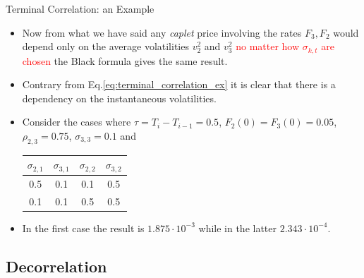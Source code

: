 \documentclass{beamer}
\begin{document}
\begin{frame}{Terminal Correlation: an Example}
\begin{itemize}
\item Now from what we have said any \emph{caplet} price involving the rates $F_3, F_2$ would depend only on the average volatilities $v_2^2$ and $v_3^2$ \textcolor{red}{no matter how $\sigma_{k,t}$ are chosen} the Black formula gives the same result.
\item Contrary from Eq.\ref{eq:terminal_correlation_ex} it is clear that there is a dependency on the instantaneous volatilities.
\item Consider the cases where $\tau=T_i - T_{i-1}=0.5$, $F_2(0)=F_3(0)=0.05$, $\rho_{2,3}=0.75$, $\sigma_{3,3}=0.1$ and
\begin{center}
\begin{tabular}{|c|c|c|c|}
\hline
$\sigma_{2,1}$ & $\sigma_{3,1}$ & $\sigma_{2,2}$ & $\sigma_{3,2}$ \\ \hline
0.5 & 0.1 & 0.1 & 0.5 \\ \hline
0.1 & 0.1 & 0.5 & 0.5 \\ \hline
\end{tabular}
\end{center}
\item In the first case the result is $1.875\cdot10^{-3}$ while in the latter $2.343\cdot10^{-4}$.
\end{itemize}
\end{frame}

\subsection{Decorrelation}
\end{document}
